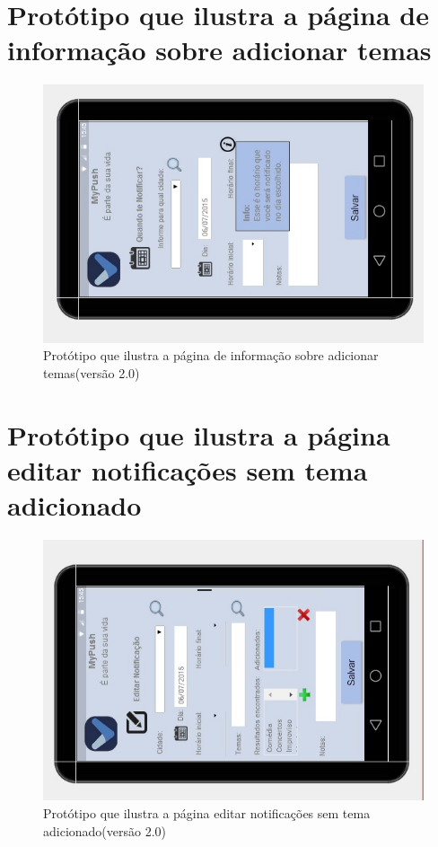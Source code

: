 \begin{apendicesenv}
    \pagebreak
      \section*{Protótipo que ilustra a página de informação sobre adicionar temas}

    \begin{figure}[!htbp]
      \centering
      \includegraphics[scale=0.9, angle=-90]{editaveis/figuras/prototipo_alta_fidelidade_v2/2_13}
      \caption{Protótipo que ilustra a página de informação sobre adicionar temas(versão 2.0)}
      \label{v2}
    \end{figure}
    
    \pagebreak
      \section*{Protótipo que ilustra a página editar notificações sem tema adicionado}

    \begin{figure}[!htbp]
      \centering
      \includegraphics[scale=0.9, angle=-90]{editaveis/figuras/prototipo_alta_fidelidade_v2/2_14}
      \caption{Protótipo que ilustra a página editar notificações sem tema adicionado(versão 2.0)}
      \label{v2}
    \end{figure}
    

\end{apendicesenv}
